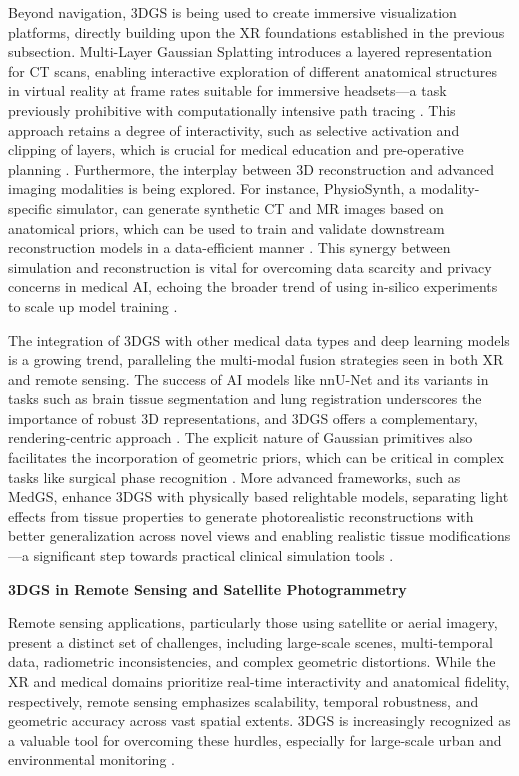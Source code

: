 \documentclass[11pt]{article}
\begin{document}
Beyond navigation, 3DGS is being used to create immersive visualization platforms, directly building upon the XR foundations established in the previous subsection. Multi-Layer Gaussian Splatting introduces a layered representation for CT scans, enabling interactive exploration of different anatomical structures in virtual reality at frame rates suitable for immersive headsets---a task previously prohibitive with computationally intensive path tracing \cite{ref692}. This approach retains a degree of interactivity, such as selective activation and clipping of layers, which is crucial for medical education and pre-operative planning \cite{ref692}. Furthermore, the interplay between 3D reconstruction and advanced imaging modalities is being explored. For instance, PhysioSynth, a modality-specific simulator, can generate synthetic CT and MR images based on anatomical priors, which can be used to train and validate downstream reconstruction models in a data-efficient manner \cite{ref693}. This synergy between simulation and reconstruction is vital for overcoming data scarcity and privacy concerns in medical AI, echoing the broader trend of using in-silico experiments to scale up model training \cite{ref694}.

The integration of 3DGS with other medical data types and deep learning models is a growing trend, paralleling the multi-modal fusion strategies seen in both XR and remote sensing. The success of AI models like nnU-Net and its variants in tasks such as brain tissue segmentation and lung registration underscores the importance of robust 3D representations, and 3DGS offers a complementary, rendering-centric approach \cite{ref695}. The explicit nature of Gaussian primitives also facilitates the incorporation of geometric priors, which can be critical in complex tasks like surgical phase recognition \cite{ref696}. More advanced frameworks, such as MedGS, enhance 3DGS with physically based relightable models, separating light effects from tissue properties to generate photorealistic reconstructions with better generalization across novel views and enabling realistic tissue modifications---a significant step towards practical clinical simulation tools \cite{ref697}.

\textbf{3DGS in Remote Sensing and Satellite Photogrammetry}

Remote sensing applications, particularly those using satellite or aerial imagery, present a distinct set of challenges, including large-scale scenes, multi-temporal data, radiometric inconsistencies, and complex geometric distortions. While the XR and medical domains prioritize real-time interactivity and anatomical fidelity, respectively, remote sensing emphasizes scalability, temporal robustness, and geometric accuracy across vast spatial extents. 3DGS is increasingly recognized as a valuable tool for overcoming these hurdles, especially for large-scale urban and environmental monitoring \cite{ref698,ref113}.
\end{document}
